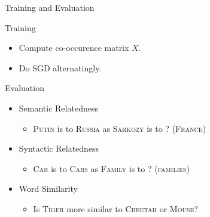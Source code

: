 \begin{frame}{Training and Evaluation}
  \begin{exampleblock}{Training}
    \begin{itemize}[<+->]
    \item Compute co-occurence matrix $X$.
    \item Do SGD alternatingly.
    \end{itemize}
  \end{exampleblock}
  \begin{alertblock}{Evaluation}
    \begin{itemize}[<+->]
    \item Semantic Relatedness %
      \begin{itemize}
      \item \textsc{Putin} is to \textsc{Russia} as \textsc{Sarkozy} is to ? (\textsc{France})
      \end{itemize}
    \item Syntactic Relatedness %
      \begin{itemize}
      \item \textsc{Car} is to \textsc{Cars} as \textsc{Family} is to ? (\textsc{families})
      \end{itemize}
    \item Word Similarity
      \begin{itemize}
      \item Is \textsc{Tiger} more similar to \textsc{Cheetah} or \textsc{Mouse}?
        \end{itemize}
    \end{itemize}
  \end{alertblock}
\end{frame}

